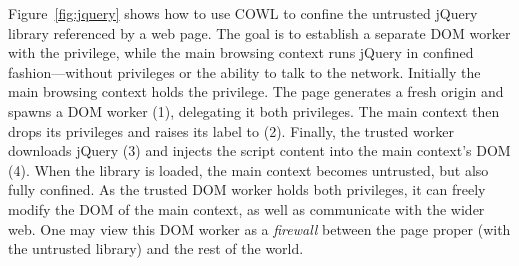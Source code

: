 Figure~\ref{fig:jquery} shows how to use COWL to confine the untrusted
jQuery library referenced by a web page. The goal is to establish a
separate DOM worker with the  privilege, while the main
browsing context runs jQuery in confined fashion---without privileges
or the ability to talk to the network. Initially the main browsing
context holds the  privilege. The page generates a fresh
origin  and spawns a DOM worker (1), delegating it both
privileges. The main context then drops its privileges and raises its
label to  (2). Finally, the trusted worker
downloads jQuery (3) and injects the script content into the main
context's DOM (4).  When the library is loaded, the main context
becomes untrusted, but also fully confined. As the trusted DOM worker
holds both privileges, it can freely modify the DOM of the main
context, as well as communicate with the wider web. One may view
this DOM worker as a \emph{firewall} between the page proper (with the
untrusted library) and the rest of the world.
